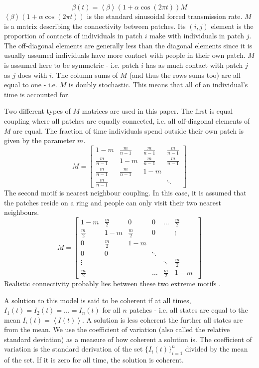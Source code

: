 \documentclass[twocolumn,nofootinbib,showkeys,twoside,floatfix,unsortedaddress,flushbottom,10pt,aps,pra]{report}
\begin{document}
\begin{equation}
  \beta(t) = \left < \beta \right > (1+\alpha \cos(2\pi t))M
\end{equation}
$\left < \beta \right > (1+\alpha \cos(2\pi t))$ is the standard sinusoidal forced transmission rate. $M$ is a matrix describing the connectivity between patches. Its $(i,j)$ element is the proportion of contacts of individuals in patch $i$ make with individuals in patch $j$. The off-diagonal elements are generally less than the diagonal elements since it is usually assumed individuals have more contact with people in their own patch. $M$ is assumed here to be symmetric - i.e. patch $i$ has as much contact with patch $j$ as $j$ does with $i$. The column sums of $M$ (and thus the rows sums too) are all equal to one - i.e. $M$ is doubly stochastic. This means that all of an individual's time is accounted for. 
\par \smallskip \qquad
Two different types of $M$ matrices are used in this paper. The first is equal coupling where all patches are equally connected, i.e. all off-diagonal elements of $M$ are equal. The fraction of time individuals spend outside their own patch is given by the parameter $m$.
\[
M =
\begin{bmatrix}
  1-m & \frac{m}{n-1} & \frac{m}{n-1} & \frac{m}{n-1} \\
  \frac{m}{n-1} & 1-m & \frac{m}{n-1} & \frac{m}{n-1}  \\
  \frac{m}{n-1} & \frac{m}{n-1} & 1-m &  \\
  \frac{m}{n-1} &  &  & \ddots 
\end{bmatrix}
\]
The second motif is nearest neighbour coupling. In this case, it is assumed that the patches reside on a ring and people can only visit their two nearest neighbours.
\[
M =
\begin{bmatrix}
  1-m & \frac{m}{2} & 0 & 0 & \dots & \frac{m}{2} \\
  \frac{m}{2} & 1-m & \frac{m}{2} & 0 & & \vdots \\
  0 & \frac{m}{2} & 1-m &  \\
  0 & 0 & & \ddots \\
  \vdots & & & & \ddots & \frac{m}{2} \\
  \frac{m}{2} &  & & \dots & \frac{m}{2} & 1-m \ 
\end{bmatrix}
\]
Realistic connectivity probably lies between these two extreme motifs \cite{Earn2000}.\par
 \smallskip \qquad
A solution to this model is said to be coherent if at all times, $I_1(t)=I_2(t)=...=I_n(t)$ for all $n$ patches \cite{McCluskey2011} - i.e. all states are equal to the mean $I_i(t)=\left < I(t) \right >$. A solution is less coherent the further all states are from the mean. We use the coefficient of variation (also called the relative standard deviation) as a measure of how coherent a solution is. The coefficient of variation is the standard derivation of the set $\{I_i(t)\}_{i=1}^n$ divided by the mean of the set. If it is zero for all time, the solution is coherent.
\end{document}
